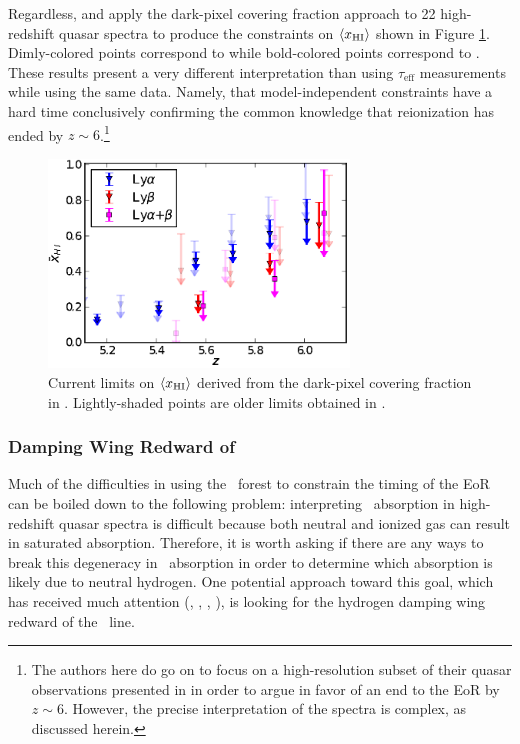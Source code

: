 Regardless, \cite{McGreer:2011dm} and \cite{McGreer:2014qwa} apply the dark-pixel covering fraction approach to 22 high-redshift quasar spectra to produce the constraints on $\langle x_{\text{HI}}\rangle$ shown in Figure \ref{fig:McGreer}. Dimly-colored points correspond to \cite{McGreer:2011dm} while bold-colored points correspond to \cite{McGreer:2014qwa}. These results present a very different interpretation than using $\tau_{\text{eff}}$ measurements while using the same data. Namely, that model-independent constraints have a hard time conclusively confirming the common knowledge that reionization has ended by $z \sim 6$.\footnote{The authors here do go on to focus on a high-resolution subset of their quasar observations presented in \cite{McGreer:2014qwa} in order to argue in favor of an end to the EoR by $z \sim 6$. However, the precise interpretation of the spectra is complex, as discussed herein.} 

\begin{figure}[h]
  \centering
  \includegraphics[width=8cm]{xhi_newdata.eps}
  \caption{Current limits on $\langle x_{\text{HI}}\rangle$ derived from the dark-pixel covering fraction in \cite{McGreer:2014qwa}. Lightly-shaded points are older limits obtained in \cite{McGreer:2011dm}.}
  \label{fig:McGreer}
\end{figure}



\subsubsection{Damping Wing Redward of \lya}\label{sec:IntroDampingWing}

Much of the difficulties in using the \lya\ forest to constrain the timing of the EoR can be boiled down to the following problem: interpreting \lya\ absorption in high-redshift quasar spectra is difficult because both neutral and ionized gas can result in saturated absorption. Therefore, it is worth asking if there are any ways to break this degeneracy in \lya\ absorption in order to determine which absorption is likely due to neutral hydrogen. One potential approach toward this goal, which has received much attention (\citealt{Chornock:2013una}, \citealt{Chornock:2014fva}, \citealt{Mortlock2011}, \citealt{Bolton:2011vb}), is looking for the hydrogen damping wing redward of the \lya\ line. 


